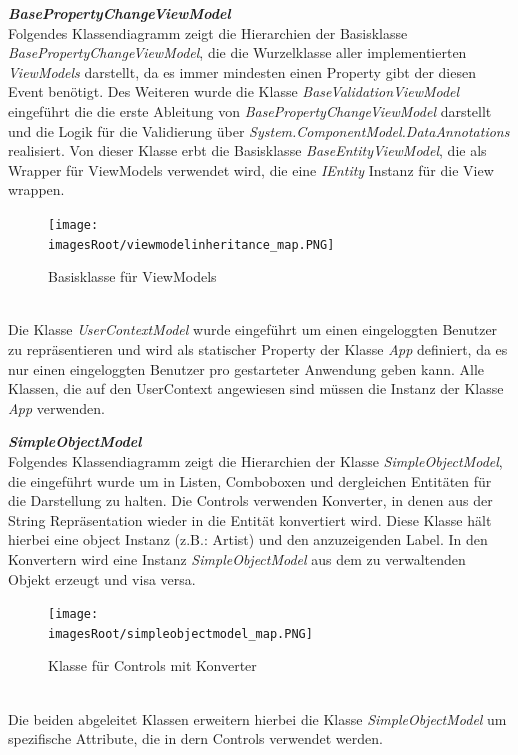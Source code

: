 \documentclass[11pt, a4paper, twoside]{article}   	%
\newcommand{\imagesRoot}{images}
\begin{document}
\newpage
\textbf{\emph{BasePropertyChangeViewModel}}\\
Folgendes Klassendiagramm zeigt die Hierarchien der Basisklasse \emph{BasePropertyChangeViewModel}, die die Wurzelklasse aller implementierten \emph{ViewModels} darstellt, da es immer mindesten einen Property gibt der diesen Event benötigt. Des Weiteren wurde die Klasse \emph{BaseValidationViewModel} eingeführt die die erste Ableitung von \emph{BasePropertyChangeViewModel} darstellt und die Logik für die Validierung über \emph{System.ComponentModel.DataAnnotations} realisiert. Von dieser Klasse erbt die Basisklasse \emph{BaseEntityViewModel}, die als Wrapper für ViewModels verwendet wird, die eine \emph{IEntity} Instanz für die View wrappen.
\begin{figure}[h]
	\centering
	\texttt{[image: \\imagesRoot/viewmodelinheritance\_map.PNG]}
	\caption
	{Basisklasse für ViewModels}
\end{figure}
\ \\
Die Klasse \emph{UserContextModel} wurde eingeführt um einen eingeloggten Benutzer zu repräsentieren und wird als statischer Property der Klasse \emph{App} definiert, da es nur einen eingeloggten Benutzer pro gestarteter Anwendung geben kann. Alle Klassen, die auf den UserContext angewiesen sind müssen die Instanz der Klasse \emph{App} verwenden.

\newpage
\textbf{\emph{SimpleObjectModel}}\\
Folgendes Klassendiagramm zeigt die Hierarchien der Klasse \emph{SimpleObjectModel}, die eingeführt wurde um in Listen, Comboboxen und dergleichen Entitäten für die Darstellung zu halten. Die Controls verwenden Konverter, in denen aus der String Repräsentation wieder in die Entität konvertiert wird. Diese Klasse hält hierbei eine object Instanz (z.B.: Artist) und den anzuzeigenden Label. In den Konvertern wird eine Instanz \emph{SimpleObjectModel} aus dem zu verwaltenden Objekt erzeugt und visa versa.
\begin{figure}[h]
	\centering
	\texttt{[image: \\imagesRoot/simpleobjectmodel\_map.PNG]}
	\caption
	{Klasse für Controls mit Konverter}
\end{figure}
\ \\
Die beiden abgeleitet Klassen erweitern hierbei die Klasse \emph{SimpleObjectModel} um spezifische Attribute, die in dern Controls verwendet werden.
\end{document}

